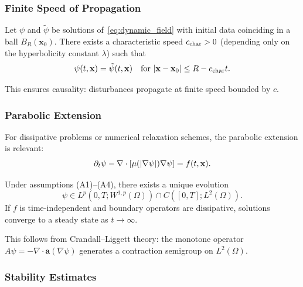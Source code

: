 \subsubsection{Finite Speed of Propagation}

\begin{theorem}\label{thm:finite-speed}
Let $\psi$ and $\tilde\psi$ be solutions of~\eqref{eq:dynamic_field} with 
initial data coinciding in a ball $B_R(\mathbf{x}_0)$. There exists a 
characteristic speed $c_{\rm char} > 0$ (depending only on the hyperbolicity 
constant $\lambda$) such that
\begin{equation}
\psi(t,\mathbf{x}) = \tilde\psi(t,\mathbf{x}) \quad \text{for } 
|\mathbf{x} - \mathbf{x}_0| \leq R - c_{\rm char}t.
\end{equation}
\end{theorem}

This ensures causality: disturbances propagate at finite speed bounded by $c$.

\subsubsection{Parabolic Extension}

For dissipative problems or numerical relaxation schemes, the parabolic 
extension is relevant:
\begin{equation}
\partial_t\psi - \nabla\cdot[\mu(|\nabla\psi|)\nabla\psi] = f(t,\mathbf{x}).
\label{eq:parabolic-extension}
\end{equation}

\begin{theorem}\label{thm:parabolic}
Under assumptions (A1)--(A4), there exists a unique evolution
\begin{equation}
\psi \in L^p(0,T; W^{1,p}(\Omega)) \cap C([0,T]; L^2(\Omega)).
\end{equation}
If $f$ is time-independent and boundary operators are dissipative, 
solutions converge to a steady state as $t \to \infty$.
\end{theorem}

This follows from Crandall--Liggett theory: the monotone operator 
$A\psi = -\nabla\cdot\mathbf{a}(\nabla\psi)$ generates a contraction 
semigroup on $L^2(\Omega)$.

\subsubsection{Stability Estimates}

